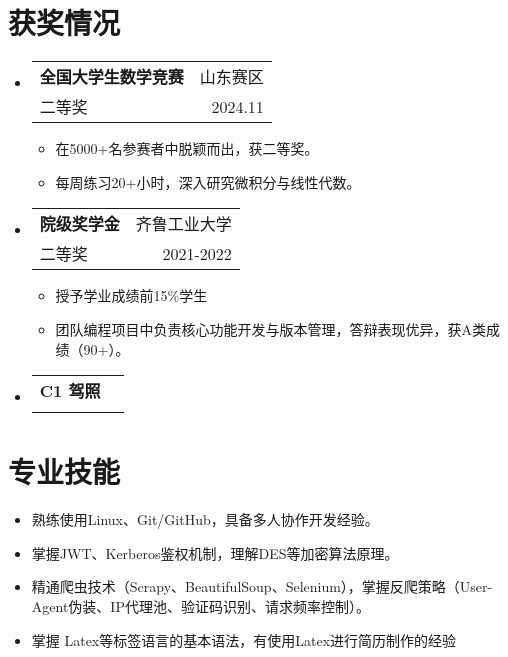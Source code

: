 \documentclass[a4paper,11pt]{ctexart}
\makeatletter
\newenvironment{resumeList}{\begin{itemize}[leftmargin=*,label={}]}{\end{itemize}}
\newcommand{\resumeItem}[1]{\item\small{#1}}
\newcommand{\resumeEntry}[4]{
  \item \begin{tabular*}{0.97\textwidth}[t]{l@{\extracolsep{\fill}}r}
    \textbf{#1} & #2 \\
    #3 & #4 \\
  \end{tabular*}
}
\makeatother
\begin{document}
\section{获奖情况}
\begin{resumeList}
    \resumeEntry{全国大学生数学竞赛}{山东赛区}{二等奖}{2024.11}
    \begin{resumeList}
        \resumeItem{在5000+名参赛者中脱颖而出，获二等奖。}
        \resumeItem{每周练习20+小时，深入研究微积分与线性代数。}
    \end{resumeList}
    \resumeEntry{院级奖学金}{齐鲁工业大学}{二等奖}{2021-2022}
    \begin{resumeList}
        \resumeItem{授予学业成绩前15\%学生}
        \resumeItem{团队编程项目中负责核心功能开发与版本管理，答辩表现优异，获A类成绩（90+）。}
    \end{resumeList}
    \resumeEntry{C1 驾照}{}{}{}
\end{resumeList}

\section{专业技能}
\begin{resumeList}
    \resumeItem{熟练使用Linux、Git/GitHub，具备多人协作开发经验。}
    \resumeItem{掌握JWT、Kerberos鉴权机制，理解DES等加密算法原理。}
    \resumeItem{精通爬虫技术（Scrapy、BeautifulSoup、Selenium），掌握反爬策略（User-Agent伪装、IP代理池、验证码识别、请求频率控制）。}
    \resumeItem{掌握 Latex等标签语言的基本语法，有使用Latex进行简历制作的经验}
\end{resumeList}
\end{document}

